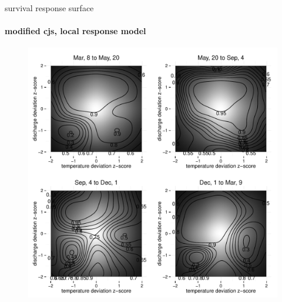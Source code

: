 \documentclass[show notes]{beamer}
\begin{document}
\begin{frame}{survival response surface}
  \framesubtitle{modified cjs, local response model}

	\begin{figure}
	\includegraphics[clip, trim=0 0 0 35, height=.8\textheight]{donut-environmental-effect-on-survival.pdf}
  	\end{figure}

\end{frame}
\end{document}
